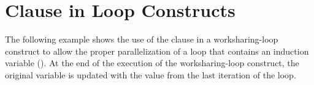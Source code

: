 \section{ Clause in Loop Constructs}
\label{sec:linear_in_loop}

The following example shows the use of the  clause in a worksharing-loop 
construct to allow the proper parallelization of a loop that contains 
an induction variable ().  At the end of the execution of 
the worksharing-loop construct, the original variable  is updated with 
the value  from the last iteration of the loop.



